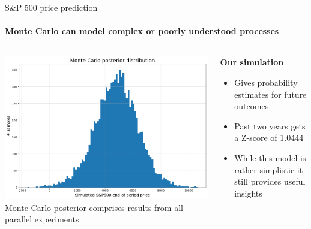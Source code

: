 \documentclass{beamer}
\begin{document}
\begin{frame}{S\&P 500 price prediction}
  \framesubtitle{Monte Carlo can model complex or poorly understood processes}
  \begin{columns}[c]
    \begin{column}{0.5\textwidth}
      \begin{center}
        \includegraphics[width=\textwidth]{images/posterior.png}
        \\[0.2cm]
        \small{Monte Carlo posterior comprises results from all parallel experiments}
      \end{center}
    \end{column}
    \begin{column}{0.5\textwidth}
      \textbf{Our simulation}
      \begin{itemize}
        \item Gives probability estimates for future outcomes
        \item Past two years gets a Z-score of 1.0444
        \item While this model is rather simplistic it still provides useful insights
      \end{itemize}
    \end{column}
  \end{columns}
\end{frame}
\end{document}

